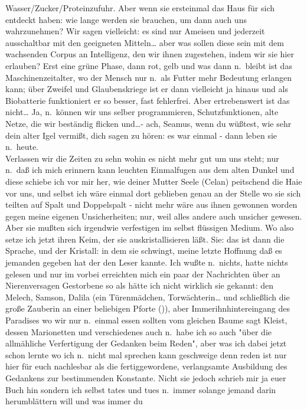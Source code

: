 \documentclass[
]{article}
\begin{document}
Wasser/Zucker/Proteinzufuhr. Aber wenn sie ersteinmal das Haus für sich
entdeckt haben: wie lange werden sie brauchen, um dann auch uns
wahrzunehmen? Wir sagen vielleicht: es sind nur Ameisen und jederzeit
ausschaltbar mit den geeigneten Mitteln\ldots{} aber was sollen diese
sein mit dem wachsenden Corpus an Intelligenz, den wir ihnen zugestehen,
indem wir sie hier erlauben? Erst eine grüne Phase, dann rot, gelb und
was dann n.~bleibt ist das Maschinenzeitalter, wo der Mensch nur n.~als
Futter mehr Bedeutung erlangen kann; über Zweifel und Glaubenskriege ist
er dann vielleicht ja hinaus und als Biobatterie funktioniert er so
besser, fast fehlerfrei. Aber ertrebenswert ist das nicht\ldots{} Ja,
n.~können wir uns selber programmieren, Schutzfunktionen, alte Netze,
die wir beständig flicken und\ldots- ach, Seamus, wenn du wüßtest, wie
sehr dein alter Igel vermißt, dich sagen zu hören: es war einmal - dann
leben sie n.~heute.\\
Verlassen wir die Zeiten zu sehn wohin es nicht mehr gut um uns steht;
nur n.~daß ich mich erinnern kann leuchten Einmalfugen aus dem alten
Dunkel und diese schiebe ich vor mir her, wie deiner Mutter Seele
(Celan) peitschend die Haie vor uns, und selbst ich wäre einmal dort
geblieben genau an der Stelle wo sie sich teilten auf Spalt und
Doppelspalt - nicht mehr wäre aus ihnen gewonnen worden gegen meine
eigenen Unsicherheiten; nur, weil alles andere auch unsicher gewesen.
Aber sie mußten sich irgendwie verfestigen im selbst flüssigen Medium.
Wo also setze ich jetzt ihren Keim, der sie auskristallisieren läßt.
Sie: das ist dann die Sprache, und der Kristall: in dem sie schwingt,
meine letzte Hoffnung daß es jemanden gegeben hat der den Leser kannte.
Ich wußte n.~nichts, hatte nichts gelesen und nur im vorbei erreichten
mich ein paar der Nachrichten über an Nierenversagen Gestorbene so als
hätte ich nicht wirklich sie gekannt: den Melech, Samson, Dalila (ein
Türenmädchen, Torwächterin\ldots{} und schließlich die große Zauberin an
einer beliebigen Pforte ()), aber Immerihnhintereingang des Paradises wo
wir nur n.~einmal essen sollten vom gleichen Baume sagt Kleist, dessen
Marionetten und verschiedenes auch n.~habe ich so auch "über die
allmähliche Verfertigung der Gedanken beim Reden", aber was ich dabei
jetzt schon lernte wo ich n.~nicht mal sprechen kann geschweige denn
reden ist nur hier für euch nachlesbar als die fertiggewordene,
verlangsamte Ausbildung des Gedankens zur bestimmenden Konstante. Nicht
sie jedoch schrieb mir ja euer Buch hin sondern ich selbst tates und
tues n.~immer solange jemand darin herumblättern will und was immer du
\end{document}
